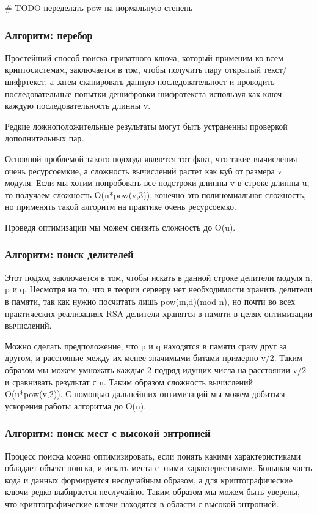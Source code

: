 \documentclass[20pt]{article}
\begin{document}
\# TODO переделать pow на нормальную степень

\subsubsection{Алгоритм: перебор}
Простейший способ поиска приватного ключа, который применим ко всем
криптосистемам, заключается в том, чтобы получить пару открытый текст/шифртекст,
а затем сканировать данную последовательност и проводить последовательные попытки
дешифровки шифротекста используя как ключ каждую последовательность длинны v.

Редкие ложноположительные результаты могут быть устраненны проверкой
дополнительных пар.

Основной проблемой такого подхода является тот факт, что такие вычисления очень
ресурсоемкие, а сложность вычислений растет как куб от размера v модуля. Если мы
хотим попробовать все подстроки длинны v в строке длинны u, то получаем сложность
O(n*pow(v,3)), конечно это полиномиальная сложность, но применять такой алгоритм
на практике очень ресурсоемко.

Проведя оптимизации мы можем снизить сложность до O(u).

\subsubsection{Алгоритм: поиск делителей}
Этот подход заключается в том, чтобы искать в данной строке делители модуля n,
p и q. Несмотря на то, что в теории серверу нет необходимости хранить делители в
памяти, так как нужно посчитать лишь pow(m,d)(mod n), но почти во всех практических
реализациях RSA делители хранятся в памяти в целях оптимизации вычислений.

Можно сделать предположение, что p и q находятся в памяти сразу друг за другом,
и расстояние между их менее значимыми битами примерно v/2. Таким образом мы можем
умножать каждые 2 подряд идущих числа на расстоянии v/2 и сравнивать результат с
n. Таким образом сложность вычислений O(u*pow(v,2)). С помощью дальнейших оптимизаций
мы можем добиться ускорения работы алгоритма до O(n).

\subsubsection{Алгоритм: поиск мест с высокой энтропией}
Процесс поиска можно оптимизировать, если понять какими характеристиками обладает
объект поиска, и искать места с этими характеристиками. Большая часть кода и данных
формируется неслучайным образом, а для криптографические ключи редко выбирается
неслучайно. Таким образом мы можем быть уверены, что криптографические ключи находятся
в области с высокой энтропией.
\end{document}
